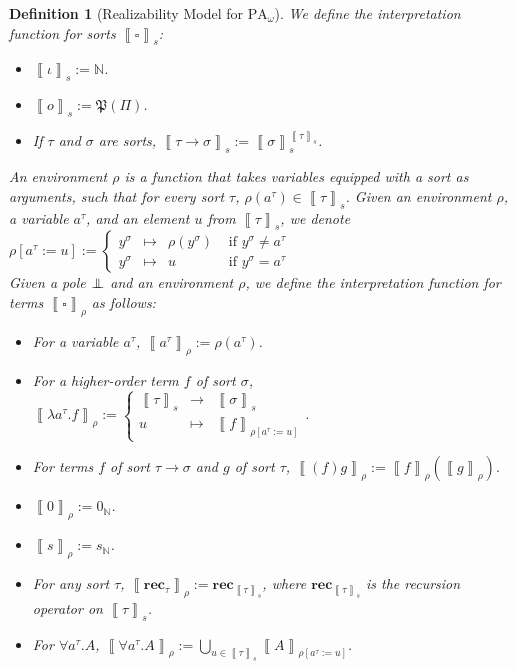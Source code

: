 \documentclass[a4paper,12pt]{article}
\newtheorem{defi}[theo]{Definition}
\theoremstyle{rmqstyle}
\newcommand{\N}{\mathbb{N}}
\newcommand{\itp}[1]{\left\llbracket#1\right\rrbracket}
\newcommand{\fundefdef}[3]{#1:= \left\{\begin{array}{ccc}#2\\#3\end{array}\right.}
\newcommand{\PA}{\mathrm{PA}}
\newcommand{\rec}{\mathbf{rec}}
\renewcommand{\P}{\mathfrak{P}}
\newcommand{\pole}{{\protect\mathpalette{\protect\polehelper}{\bot}}} \def\polehelper#1#2{\mathrel{\rlap{$#1#2$}\mkern3mu{#1#2}}}
\begin{document}
\begin{defi}[Realizability Model for $\PA_\omega$]
We define the interpretation function for sorts $\itp{\square}_s$: 
\begin{itemize}
\setlength\itemsep{ -1 em}
\item $\itp{\iota}_s := \N$.\\
\item $\itp{o}_s := \P(\Pi)$.\\
\item If $\tau$ and $\sigma$ are sorts, $\itp{\tau \to \sigma}_s := \itp{\sigma}_s^{\itp{\tau}_s}$.
\end{itemize}
An environment $\rho$ is a function that takes variables equipped with a sort as arguments, such that for every sort $\tau$, $\rho(a^\tau) \in \itp{\tau}_s$. Given an environment $\rho$, a variable $a^\tau$, and an element $u$ from $\itp{\tau}_s$, we denote $\rho[a^\tau := u] := 
\left\{\begin{array}{cccc}
y^\sigma& \mapsto& \rho(y^\sigma) &\text{ if } y^\sigma \neq a^\tau\\
y^\sigma& \mapsto& u                      &\text{ if } y^\sigma = a^\tau
\end{array}\right. $\\
Given a pole $\pole$ and an environment $\rho$, we define the interpretation function for terms $\itp{\square}_\rho$ as follows:
\begin{itemize}
\setlength\itemsep{ -1 em}
\item For a variable $a^\tau$, $\itp{a^\tau}_\rho := \rho(a^\tau)$.\\
\item For a higher-order term $f$ of sort $\sigma$, $\fundefdef{\itp{\lambda a^\tau. f}_\rho}{\itp{\tau}_s& \to& \itp{\sigma}_s}{u& \mapsto& \itp{f}_{\rho[a^\tau := u]} }$.\\
\item For terms $f$ of sort $\tau \to \sigma$ and $g$ of sort $\tau$, $\itp{(f)g}_\rho := \itp{f}_\rho(\itp{g}_\rho)$.\\
\item $\itp{0}_\rho := 0_\N$.\\
\item $\itp{s}_\rho := s_\N$.\\
\item For any sort $\tau$, $\itp{\rec_\tau}_\rho := \rec_{\itp{\tau}_s}$, where $\rec_{\itp{\tau}_s}$ is the recursion operator on $\itp{\tau}_s$.\\
\item For $\forall a^\tau. A$, $\itp{\forall a^\tau. A}_\rho := \bigcup_{u \in \itp{\tau}_s} \itp{A}_{\rho[a^\tau := u]}$.\\

\end{itemize}
\end{defi}
\end{document}
